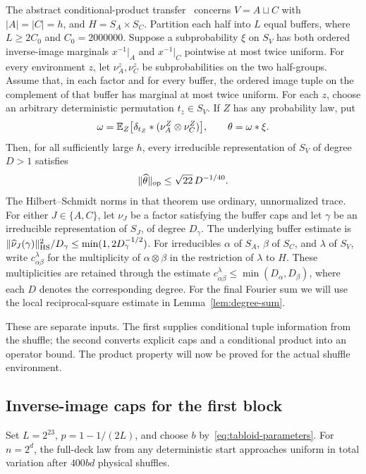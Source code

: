 The abstract conditional-product transfer~\cite[Theorem ``Conditional-product transfer'']{partial-fourier} concerns $V=A\sqcup C$ with $|A|=|C|=h$, and $H=S_A\times S_C$. Partition each half into $L$ equal buffers, where $L\ge2C_0$ and $C_0=2000000$. Suppose a subprobability $\xi$ on $S_V$ has both ordered inverse-image marginals $x^{-1}|_A$ and $x^{-1}|_C$ pointwise at most twice uniform. For every environment $z$, let $\nu_A^z,\nu_C^z$ be subprobabilities on the two half-groups. Assume that, in each factor and for every buffer, the ordered image tuple on the complement of that buffer has marginal at most twice uniform. For each $z$, choose an arbitrary deterministic permutation $t_z\in S_V$. If $Z$ has any probability law, put
\[
 \omega=\mathbb E_Z\big[\delta_{t_Z}*(\nu_A^Z\otimes\nu_C^Z)\big],
 \qquad \theta=\omega*\xi.
\]
Then, for all sufficiently large $h$, every irreducible representation of $S_V$ of degree $D>1$ satisfies
\begin{equation}\label{eq:tabloid-transfer}
 \|\widehat\theta\|_{\mathrm{op}}\le\sqrt{22}\,D^{-1/40}.
\end{equation}
The Hilbert--Schmidt norms in that theorem use ordinary, unnormalized trace. For either $J\in\{A,C\}$, let $\nu_J$ be a factor satisfying the buffer caps and let $\gamma$ be an irreducible representation of $S_J$, of degree $D_\gamma$. The underlying buffer estimate is
$\|\widehat\nu_J(\gamma)\|_{\mathrm{HS}}^2/D_\gamma\le\min(1,2D_\gamma^{-1/2})$.
For irreducibles $\alpha$ of $S_A$, $\beta$ of $S_C$, and $\lambda$ of $S_V$, write $c_{\alpha\beta}^{\lambda}$ for the multiplicity of $\alpha\otimes\beta$ in the restriction of $\lambda$ to $H$. These multiplicities are retained through the estimate
$c_{\alpha\beta}^{\lambda}\le\min(D_\alpha,D_\beta)$, where each $D$ denotes the corresponding degree.
For the final Fourier sum we will use the local reciprocal-square estimate in Lemma~\ref{lem:degree-sum}.

These are separate inputs. The first supplies conditional tuple information from the shuffle; the second converts explicit caps and a conditional product into an operator bound. The product property will now be proved for the actual shuffle environment.

\subsection{Inverse-image caps for the first block}

\begin{theorem}\label{thm:two-halves}
Set $L=2^{23}$, $p=1-1/(2L)$, and choose $b$ by~\eqref{eq:tabloid-parameters}. For $n=2^d$, the full-deck law from any deterministic start approaches uniform in total variation after $400bd$ physical shuffles.
\end{theorem}


